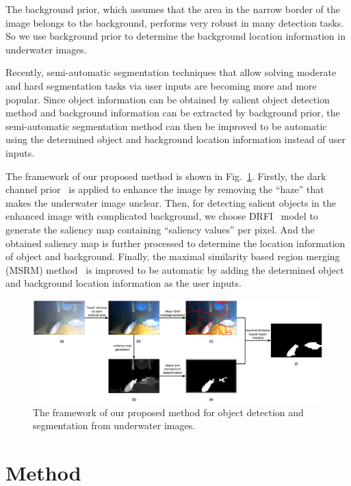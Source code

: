 \documentclass[conference]{IEEEtran}
\begin{document}
The background prior, which assumes that the area in the narrow border of the image belongs to the background, performs very robust in many detection tasks. So we use background prior to determine the background location information in underwater images. 

Recently, semi-automatic segmentation techniques that allow solving moderate and hard segmentation tasks via user inputs are becoming more and more popular. Since object information can be obtained by salient object detection method and background information can be extracted by background prior, the semi-automatic segmentation method can then be improved to be automatic using the determined object and background location information instead of user inputs.

The framework of our proposed method is shown in Fig.~\ref{fig:flowchart}. Firstly, the dark channel prior~\cite{he2011single} is applied to enhance the image by removing the ``haze'' that makes the underwater image unclear. Then, for detecting salient objects in the enhanced image with complicated background, we choose DRFI~\cite{jiang2013salient} model to generate the saliency map containing ``saliency values'' per pixel. And the obtained saliency map is further processed to determine the location information of object and background. Finally, the maximal similarity based region merging (MSRM) method~\cite{ning2010interactive} is improved to be automatic by adding the determined object and background location information as the user inputs. 

\begin{figure}[t]
\centerline{\includegraphics[width=\textwidth]{figures/flowchart.eps}}
\caption{The framework of our proposed method for object detection and segmentation from underwater images.}
\label{fig:flowchart}
\end{figure} 

\section{Method}
\end{document}
